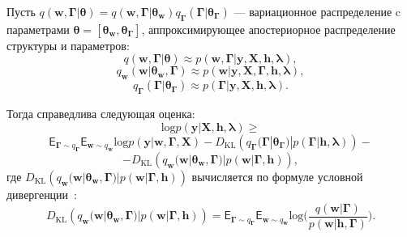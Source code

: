 \begin{theorem}
Пусть $q(\mathbf{w},\boldsymbol{\Gamma}|\boldsymbol{\theta})  = q(\mathbf{w},\boldsymbol{\Gamma}|\boldsymbol{\theta}_\mathbf{w})q_{\boldsymbol{\Gamma}}(\boldsymbol{\Gamma}|\boldsymbol{\theta}_{\boldsymbol{\Gamma}})$ --- вариационное распределение c параметрами $\boldsymbol{\theta}= [\boldsymbol{\theta}_\mathbf{w},\boldsymbol{\theta}_{\boldsymbol{\Gamma}} ]$, аппроксимирующее апостериорное распределение структуры и параметров:
\[
    q(\mathbf{w},\boldsymbol{\Gamma}|\boldsymbol{\theta}) \approx p(\mathbf{w},\boldsymbol{\Gamma}|\mathbf{y}, \mathbf{X}, \mathbf{h}, \boldsymbol{\lambda}),
\]
\[
    q_{\mathbf{w}}(\mathbf{w}|\boldsymbol{\theta}_\mathbf{w},\boldsymbol{\Gamma}) \approx p(\mathbf{w}|\mathbf{y}, \mathbf{X},  \boldsymbol{\Gamma},\mathbf{h}, \boldsymbol{\lambda}),
\]
\[
    q_{\boldsymbol{\Gamma}}(\boldsymbol{\Gamma}|\boldsymbol{\theta}_{\boldsymbol{\Gamma}}) \approx p(\boldsymbol{\Gamma}|\mathbf{y}, \mathbf{X},  \mathbf{h}, \boldsymbol{\lambda}).
\]

Тогда справедлива следующая оценка:
\begin{equation}
\label{eq:full_elbo}
\text{log} p(\mathbf{y}|\mathbf{X}, \mathbf{h}, \boldsymbol{\lambda}) \geq
\end{equation}
\[
 \mathsf{E}_{\boldsymbol{\Gamma} \sim q_{\boldsymbol{\Gamma}}}\mathsf{E}_{\mathbf{w} \sim q_{\mathbf{w}}} \text{log}p(\mathbf{y}|\mathbf{w}, \boldsymbol{\Gamma}, \mathbf{X}) - D_\text{KL}\left(q_{\boldsymbol{\Gamma}}(\boldsymbol{\Gamma}|\boldsymbol{\theta}_{\boldsymbol{\Gamma}})|p(\boldsymbol{\Gamma}|\mathbf{h}, \boldsymbol{\lambda})\right) -
\]
\[
 - D_\text{KL}\left(q_{\mathbf{w}}(\mathbf{w}|\boldsymbol{\theta}_\mathbf{w},\boldsymbol{\Gamma})|p(\mathbf{w}|\boldsymbol{\Gamma}, \mathbf{h})\right),
\]
где $D_\text{KL}\left(q_{\mathbf{w}}(\mathbf{w}|\boldsymbol{\theta}_\mathbf{w},\boldsymbol{\Gamma})|p(\mathbf{w}|\boldsymbol{\Gamma}, \mathbf{h})\right)$ вычисляется по формуле условной дивергенции~\cite{TODO}:
\[
D_\text{KL}\left(q_{\mathbf{w}}(\mathbf{w}|\boldsymbol{\theta}_\mathbf{w},\boldsymbol{\Gamma})|p(\mathbf{w}|\boldsymbol{\Gamma}, \mathbf{h})\right) = \mathsf{E}_{\boldsymbol{\Gamma} \sim q_{\boldsymbol{\Gamma}}} \mathsf{E}_{\mathbf{w} \sim q_{\mathbf{w}}} \text{log}\bigl(\frac{q(\mathbf{w}|\boldsymbol{\Gamma})}{p(\mathbf{w}|\mathbf{h},\boldsymbol{\Gamma})}\bigr).
\]
\end{theorem}

